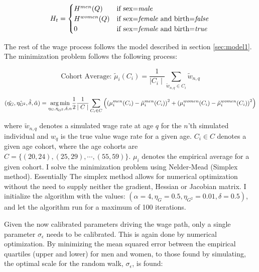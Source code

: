 \begin{equation}
    H_t = \begin{cases}
        H^{men}(Q) & \text{if sex=\textit{male}} \\
        H^{women}(Q) & \text{if sex=\textit{female} and birth=\textit{false}} \\
        0 & \text{if sex=\textit{female} and birth=\textit{true} }\\
    \end{cases}    
\end{equation}

The rest of the wage process follows the model described in section \ref{sec:model1}. The minimization problem follows the following process:

\begin{equation}
    \text{Cohort Average: } {\tilde{\mu}}_i (C_i) = \frac{1}{\mid C_i \mid} \sum_{\tilde{w}_{n, q} \in C_i} {\tilde{w}_{n, q}}
\end{equation}

\begin{equation}
 (\hat{\eta_G}, \hat{\eta_{G^2}}, \hat{\delta}, \hat{\alpha})   =  \underset{\eta_G, \eta_{G^2}, \delta, \alpha}{\operatorname*{arg\,min}}  \frac{1}{2}\frac{1}{\mid C \mid } \sum_{C_i \in C} \left(\left( \mu_{i}^{men}(C_i)  - \tilde{\mu}_i^{men}(C_i)\right)^2 + \left( \mu_{i}^{women}(C_i)  - \tilde{\mu}_i^{women}(C_i)\right)^2 \right)
\end{equation}

where $\tilde{w}_{n, q}$ denotes a simulated wage rate at age $q$ for the $n$'th simulated individual and $w_q$ is the true value wage rate for a given age. $C_i \in C$ denotes a given age cohort, where the age cohorts are $C=\{(20, 24), (25, 29), \cdots , (55, 59) \}$. $\mu_i$ denotes the empirical average for a given cohort.
I solve the minimization problem using Nelder-Mead (Simplex method). Essentially The simplex method allows for numerical optimization without the need to supply neither the gradient, Hessian or Jacobian matrix. I initialize the algorithm with the values: $(\alpha=4, \eta_G = 0.5, \eta_{G^2}=0.01, \delta=0.5)$, and let the algorithm run for a maximum of 100 iterations. 

Given the now calibrated parameters driving the wage path, only a single parameter $\sigma_\epsilon$ needs to be calibrated. This is again done by numerical optimization. By minimizing the mean squared error between the empirical quartiles (upper and lower) for men and women, to those found by simulating, the optimal scale for the random walk, $\sigma_\epsilon$, is found:

